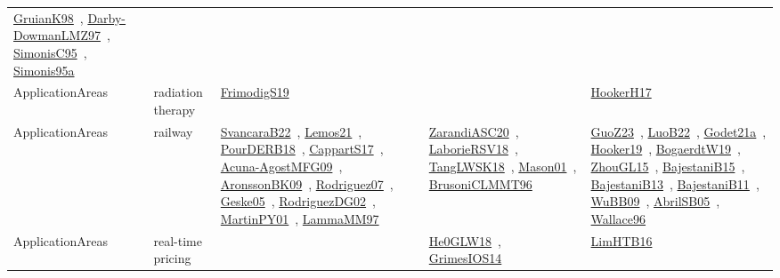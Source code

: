 {\begin{longtable}{lp{3cm}>{\raggedright\arraybackslash}p{6cm}>{\raggedright\arraybackslash}p{6cm}>{\raggedright\arraybackslash}p{8cm}}
\href{works/GruianK98.pdf}{GruianK98}~\cite{GruianK98}, \href{works/Darby-DowmanLMZ97.pdf}{Darby-DowmanLMZ97}~\cite{Darby-DowmanLMZ97}, \href{works/SimonisC95.pdf}{SimonisC95}~\cite{SimonisC95}, \href{works/Simonis95a.pdf}{Simonis95a}~\cite{Simonis95a}\\
ApplicationAreas & radiation therapy & \href{works/FrimodigS19.pdf}{FrimodigS19}~\cite{FrimodigS19} &  & \href{works/HookerH17.pdf}{HookerH17}~\cite{HookerH17}\\
ApplicationAreas & railway & \href{works/SvancaraB22.pdf}{SvancaraB22}~\cite{SvancaraB22}, \href{works/Lemos21.pdf}{Lemos21}~\cite{Lemos21}, \href{works/PourDERB18.pdf}{PourDERB18}~\cite{PourDERB18}, \href{works/CappartS17.pdf}{CappartS17}~\cite{CappartS17}, \href{works/Acuna-AgostMFG09.pdf}{Acuna-AgostMFG09}~\cite{Acuna-AgostMFG09}, \href{works/AronssonBK09.pdf}{AronssonBK09}~\cite{AronssonBK09}, \href{works/Rodriguez07.pdf}{Rodriguez07}~\cite{Rodriguez07}, \href{works/Geske05.pdf}{Geske05}~\cite{Geske05}, \href{works/RodriguezDG02.pdf}{RodriguezDG02}~\cite{RodriguezDG02}, \href{works/MartinPY01.pdf}{MartinPY01}~\cite{MartinPY01}, \href{works/LammaMM97.pdf}{LammaMM97}~\cite{LammaMM97} & \href{works/ZarandiASC20.pdf}{ZarandiASC20}~\cite{ZarandiASC20}, \href{works/LaborieRSV18.pdf}{LaborieRSV18}~\cite{LaborieRSV18}, \href{works/TangLWSK18.pdf}{TangLWSK18}~\cite{TangLWSK18}, \href{works/Mason01.pdf}{Mason01}~\cite{Mason01}, \href{works/BrusoniCLMMT96.pdf}{BrusoniCLMMT96}~\cite{BrusoniCLMMT96} & \href{works/GuoZ23.pdf}{GuoZ23}~\cite{GuoZ23}, \href{works/LuoB22.pdf}{LuoB22}~\cite{LuoB22}, \href{works/Godet21a.pdf}{Godet21a}~\cite{Godet21a}, \href{works/Hooker19.pdf}{Hooker19}~\cite{Hooker19}, \href{works/BogaerdtW19.pdf}{BogaerdtW19}~\cite{BogaerdtW19}, \href{works/ZhouGL15.pdf}{ZhouGL15}~\cite{ZhouGL15}, \href{works/BajestaniB15.pdf}{BajestaniB15}~\cite{BajestaniB15}, \href{works/BajestaniB13.pdf}{BajestaniB13}~\cite{BajestaniB13}, \href{works/BajestaniB11.pdf}{BajestaniB11}~\cite{BajestaniB11}, \href{works/WuBB09.pdf}{WuBB09}~\cite{WuBB09}, \href{works/AbrilSB05.pdf}{AbrilSB05}~\cite{AbrilSB05}, \href{works/Wallace96.pdf}{Wallace96}~\cite{Wallace96}\\
ApplicationAreas & real-time pricing &  & \href{works/He0GLW18.pdf}{He0GLW18}~\cite{He0GLW18}, \href{works/GrimesIOS14.pdf}{GrimesIOS14}~\cite{GrimesIOS14} & \href{works/LimHTB16.pdf}{LimHTB16}~\cite{LimHTB16}\\

\end{longtable}}
